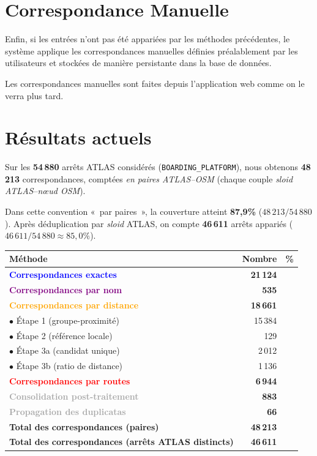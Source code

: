 \section{Correspondance Manuelle}

Enfin, si les entrées n'ont pas été appariées par les méthodes précédentes, le système applique les correspondances manuelles définies préalablement par les utilisateurs et stockées de manière persistante dans la base de données. 

Les correspondances manuelles sont faites depuis l'application web comme on le verra plus tard.

\section{Résultats actuels}

Sur les \textbf{54\,880} arrêts ATLAS considérés (\texttt{BOARDING\_PLATFORM}), nous obtenons \textbf{48\,213} correspondances, comptées \emph{en paires ATLAS--OSM} (chaque couple \textit{sloid ATLAS}--\textit{nœud OSM}).

Dans cette convention «\ par paires\ », la couverture atteint \textbf{87,9\%} (\(48\,213/54\,880\)). Après déduplication par \textit{sloid} ATLAS, on compte \textbf{46\,611} arrêts appariés (\(46\,611/54\,880 \approx 85,0\%\)).

\bigskip
\begin{tabular}{@{}l r@{\hspace{2em}}r@{}}
\toprule
\textbf{Méthode} & \textbf{Nombre} & \textbf{\%} \\
\midrule
\textcolor{blue}{\textbf{Correspondances exactes}} & \textbf{21\,124} &  \\
\textcolor{purple}{\textbf{Correspondances par nom}} & \textbf{535} &  \\
\textcolor{orange}{\textbf{Correspondances par distance}} & \textbf{18\,661} &  \\
\quad $\bullet$ Étape 1 (groupe-proximité) & 15\,384 &  \\
\quad $\bullet$ Étape 2 (référence locale) & 129 &  \\
\quad $\bullet$ Étape 3a (candidat unique) & 2\,012 &  \\
\quad $\bullet$ Étape 3b (ratio de distance) & 1\,136 &  \\
\textcolor{red}{\textbf{Correspondances par routes}} & \textbf{6\,944} &  \\
\textcolor{darkgray}{\textbf{Consolidation post-traitement}} & \textbf{883} &  \\
\textcolor{darkgray}{\textbf{Propagation des duplicatas}} & \textbf{66} &  \\
\midrule
\textbf{Total des correspondances (paires)} & \textbf{48\,213} &  \\
\textbf{Total des correspondances (arrêts ATLAS distincts)} & \textbf{46\,611} &  \\
\bottomrule
\end{tabular}
\bigskip

